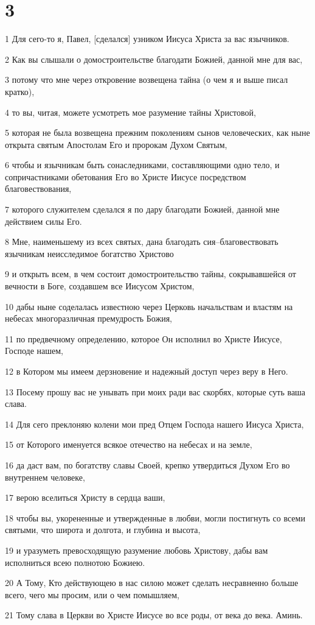 \chapter{3}

\par 1 Для сего-то я, Павел, [сделался] узником Иисуса Христа за вас язычников.
\par 2 Как вы слышали о домостроительстве благодати Божией, данной мне для вас,
\par 3 потому что мне через откровение возвещена тайна (о чем я и выше писал кратко),
\par 4 то вы, читая, можете усмотреть мое разумение тайны Христовой,
\par 5 которая не была возвещена прежним поколениям сынов человеческих, как ныне открыта святым Апостолам Его и пророкам Духом Святым,
\par 6 чтобы и язычникам быть сонаследниками, составляющими одно тело, и сопричастниками обетования Его во Христе Иисусе посредством благовествования,
\par 7 которого служителем сделался я по дару благодати Божией, данной мне действием силы Его.
\par 8 Мне, наименьшему из всех святых, дана благодать сия--благовествовать язычникам неисследимое богатство Христово
\par 9 и открыть всем, в чем состоит домостроительство тайны, сокрывавшейся от вечности в Боге, создавшем все Иисусом Христом,
\par 10 дабы ныне соделалась известною через Церковь начальствам и властям на небесах многоразличная премудрость Божия,
\par 11 по предвечному определению, которое Он исполнил во Христе Иисусе, Господе нашем,
\par 12 в Котором мы имеем дерзновение и надежный доступ через веру в Него.
\par 13 Посему прошу вас не унывать при моих ради вас скорбях, которые суть ваша слава.
\par 14 Для сего преклоняю колени мои пред Отцем Господа нашего Иисуса Христа,
\par 15 от Которого именуется всякое отечество на небесах и на земле,
\par 16 да даст вам, по богатству славы Своей, крепко утвердиться Духом Его во внутреннем человеке,
\par 17 верою вселиться Христу в сердца ваши,
\par 18 чтобы вы, укорененные и утвержденные в любви, могли постигнуть со всеми святыми, что широта и долгота, и глубина и высота,
\par 19 и уразуметь превосходящую разумение любовь Христову, дабы вам исполниться всею полнотою Божиею.
\par 20 А Тому, Кто действующею в нас силою может сделать несравненно больше всего, чего мы просим, или о чем помышляем,
\par 21 Тому слава в Церкви во Христе Иисусе во все роды, от века до века. Аминь.

